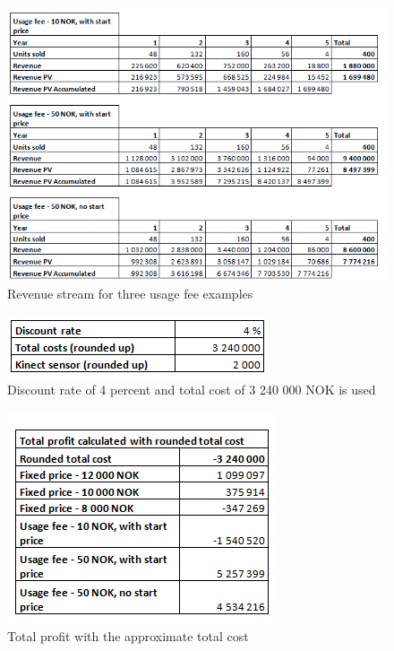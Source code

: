 \begin{figure}
\begin{center}
\includegraphics[scale=0.8]{revenuepvappendixusage}
\caption{Revenue stream for three usage fee examples}
\label{fig:revenueUsage}
\end{center}
\end{figure}

\begin{figure}
\begin{center}
\includegraphics[scale=0.8]{revenuepvappendixassumptations}
\caption{Discount rate of 4 percent and total cost of 3 240 000 NOK is used}
\label{fig:revenuePVassump}
\end{center}
\end{figure}

\begin{figure}
\begin{center}
\includegraphics[scale=0.8]{revenuepvappendixprofitrounded}
\caption{Total profit with the approximate total cost}
\label{fig:profitRounded}
\end{center}
\end{figure}

